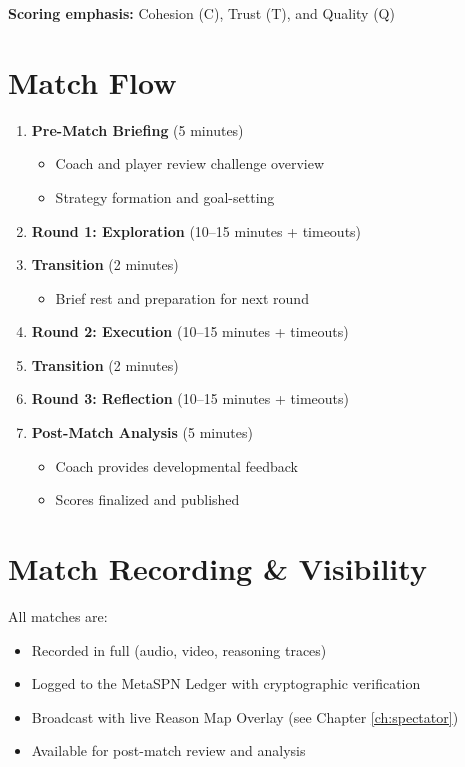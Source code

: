 \textbf{Scoring emphasis:} Cohesion (C), Trust (T), and Quality (Q)

\section{Match Flow}

\begin{enumerate}
  \item \textbf{Pre-Match Briefing} (5 minutes)
  \begin{itemize}
    \item Coach and player review challenge overview
    \item Strategy formation and goal-setting
  \end{itemize}
  
  \item \textbf{Round 1: Exploration} (10–15 minutes + timeouts)
  
  \item \textbf{Transition} (2 minutes)
  \begin{itemize}
    \item Brief rest and preparation for next round
  \end{itemize}
  
  \item \textbf{Round 2: Execution} (10–15 minutes + timeouts)
  
  \item \textbf{Transition} (2 minutes)
  
  \item \textbf{Round 3: Reflection} (10–15 minutes + timeouts)
  
  \item \textbf{Post-Match Analysis} (5 minutes)
  \begin{itemize}
    \item Coach provides developmental feedback
    \item Scores finalized and published
  \end{itemize}
\end{enumerate}

\section{Match Recording \& Visibility}

All matches are:
\begin{itemize}[leftmargin=*]
  \item Recorded in full (audio, video, reasoning traces)
  \item Logged to the MetaSPN Ledger with cryptographic verification
  \item Broadcast with live Reason Map Overlay (see Chapter \ref{ch:spectator})
  \item Available for post-match review and analysis
\end{itemize}

